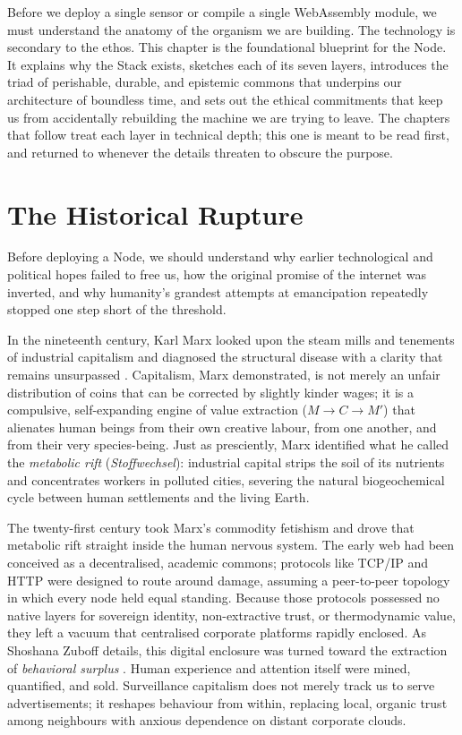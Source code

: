 Before we deploy a single sensor or compile a single WebAssembly module, we must understand the anatomy of the organism we are building. The technology is secondary to the ethos. This chapter is the foundational blueprint for the Node. It explains why the Stack exists, sketches each of its seven layers, introduces the triad of perishable, durable, and epistemic commons that underpins our architecture of boundless time, and sets out the ethical commitments that keep us from accidentally rebuilding the machine we are trying to leave. The chapters that follow treat each layer in technical depth; this one is meant to be read first, and returned to whenever the details threaten to obscure the purpose.

\section{The Historical Rupture}

Before deploying a Node, we should understand why earlier technological and political hopes failed to free us, how the original promise of the internet was inverted, and why humanity's grandest attempts at emancipation repeatedly stopped one step short of the threshold.

In the nineteenth century, Karl Marx looked upon the steam mills and tenements of industrial capitalism and diagnosed the structural disease with a clarity that remains unsurpassed \parencite{marx1867}. Capitalism, Marx demonstrated, is not merely an unfair distribution of coins that can be corrected by slightly kinder wages; it is a compulsive, self-expanding engine of value extraction ($M \to C \to M'$) that alienates human beings from their own creative labour, from one another, and from their very species-being. Just as presciently, Marx identified what he called the \textit{metabolic rift} (\textit{Stoffwechsel}): industrial capital strips the soil of its nutrients and concentrates workers in polluted cities, severing the natural biogeochemical cycle between human settlements and the living Earth.

The twenty-first century took Marx's commodity fetishism and drove that metabolic rift straight inside the human nervous system. The early web had been conceived as a decentralised, academic commons; protocols like TCP/IP and HTTP were designed to route around damage, assuming a peer-to-peer topology in which every node held equal standing. Because those protocols possessed no native layers for sovereign identity, non-extractive trust, or thermodynamic value, they left a vacuum that centralised corporate platforms rapidly enclosed. As Shoshana Zuboff details, this digital enclosure was turned toward the extraction of \textit{behavioral surplus} \parencite{zuboff2019}. Human experience and attention itself were mined, quantified, and sold. Surveillance capitalism does not merely track us to serve advertisements; it reshapes behaviour from within, replacing local, organic trust among neighbours with anxious dependence on distant corporate clouds.

